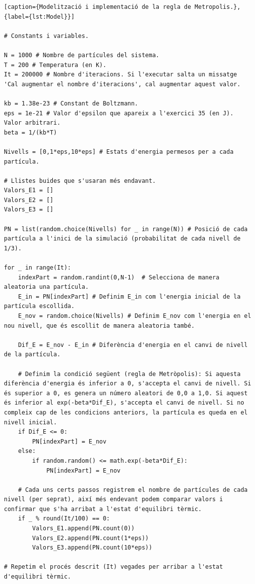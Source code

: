 \documentclass[a4paper,10.5pt]{report}
\begin{document}
\begin{lstlisting}[caption={Modelització i implementació de la regla de Metropolis.},{label={lst:Model}}]

# Constants i variables.

N = 1000 # Nombre de partícules del sistema.
T = 200 # Temperatura (en K).
It = 200000 # Nombre d'iteracions. Si l'executar salta un missatge 'Cal augmentar el nombre d'iteracions', cal augmentar aquest valor. 

kb = 1.38e-23 # Constant de Boltzmann.
eps = 1e-21 # Valor d'epsilon que apareix a l'exercici 35 (en J). Valor arbitrari. 
beta = 1/(kb*T)

Nivells = [0,1*eps,10*eps] # Estats d'energia permesos per a cada partícula. 

# Llistes buides que s'usaran més endavant.
Valors_E1 = []
Valors_E2 = []
Valors_E3 = []

PN = list(random.choice(Nivells) for _ in range(N)) # Posició de cada partícula a l'inici de la simulació (probabilitat de cada nivell de 1/3).

for _ in range(It): 
	indexPart = random.randint(0,N-1)  # Selecciona de manera aleatoria una partícula.
	E_in = PN[indexPart] # Definim E_in com l'energia inicial de la partícula escollida.
	E_nov = random.choice(Nivells) # Definim E_nov com l'energia en el nou nivell, que és escollit de manera aleatoria també.

	Dif_E = E_nov - E_in # Diferència d'energia en el canvi de nivell de la partícula.

	# Definim la condició següent (regla de Metròpolis): Si aquesta diferència d'energia és inferior a 0, s'accepta el canvi de nivell. Si és superior a 0, es genera un número aleatori de 0,0 a 1,0. Si aquest és inferior al exp(-beta*Dif_E), s'accepta el canvi de nivell. Si no compleix cap de les condicions anteriors, la partícula es queda en el nivell inicial. 
	if Dif_E <= 0: 
		PN[indexPart] = E_nov
	else:
		if random.random() <= math.exp(-beta*Dif_E):
			PN[indexPart] = E_nov

	# Cada uns certs passos registrem el nombre de partícules de cada nivell (per seprat), així més endevant podem comparar valors i confirmar que s'ha arribat a l'estat d'equilibri tèrmic. 
	if _ % round(It/100) == 0: 
		Valors_E1.append(PN.count(0)) 
		Valors_E2.append(PN.count(1*eps))
		Valors_E3.append(PN.count(10*eps))

# Repetim el procés descrit (It) vegades per arribar a l'estat d'equilibri tèrmic.
	
		
\end{lstlisting}
\end{document}
